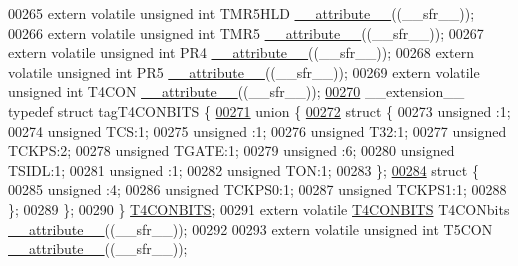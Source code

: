 \begin{DoxyCode}
00265 \textcolor{keyword}{extern} \textcolor{keyword}{volatile} \textcolor{keywordtype}{unsigned} \textcolor{keywordtype}{int}  TMR5HLD \hyperlink{a00009_a493c46f03454991ccc5aa7a6e1dfb2a7}{\_\_attribute\_\_}((\_\_sfr\_\_));
00266 \textcolor{keyword}{extern} \textcolor{keyword}{volatile} \textcolor{keywordtype}{unsigned} \textcolor{keywordtype}{int}  TMR5 \hyperlink{a00009_a493c46f03454991ccc5aa7a6e1dfb2a7}{\_\_attribute\_\_}((\_\_sfr\_\_));
00267 \textcolor{keyword}{extern} \textcolor{keyword}{volatile} \textcolor{keywordtype}{unsigned} \textcolor{keywordtype}{int}  PR4 \hyperlink{a00009_a493c46f03454991ccc5aa7a6e1dfb2a7}{\_\_attribute\_\_}((\_\_sfr\_\_));
00268 \textcolor{keyword}{extern} \textcolor{keyword}{volatile} \textcolor{keywordtype}{unsigned} \textcolor{keywordtype}{int}  PR5 \hyperlink{a00009_a493c46f03454991ccc5aa7a6e1dfb2a7}{\_\_attribute\_\_}((\_\_sfr\_\_));
00269 \textcolor{keyword}{extern} \textcolor{keyword}{volatile} \textcolor{keywordtype}{unsigned} \textcolor{keywordtype}{int}  T4CON \hyperlink{a00009_a493c46f03454991ccc5aa7a6e1dfb2a7}{\_\_attribute\_\_}((\_\_sfr\_\_));
\hypertarget{a00009_source_l00270}{}\hyperlink{a00008}{00270} \_\_extension\_\_ \textcolor{keyword}{typedef} \textcolor{keyword}{struct }tagT4CONBITS \{
\hypertarget{a00009_source_l00271}{}\hyperlink{a00009}{00271}   \textcolor{keyword}{union }\{
\hypertarget{a00009_source_l00272}{}\hyperlink{a00009}{00272}     \textcolor{keyword}{struct }\{
00273       \textcolor{keywordtype}{unsigned} :1;
00274       \textcolor{keywordtype}{unsigned} TCS:1;
00275       \textcolor{keywordtype}{unsigned} :1;
00276       \textcolor{keywordtype}{unsigned} T32:1;
00277       \textcolor{keywordtype}{unsigned} TCKPS:2;
00278       \textcolor{keywordtype}{unsigned} TGATE:1;
00279       \textcolor{keywordtype}{unsigned} :6;
00280       \textcolor{keywordtype}{unsigned} TSIDL:1;
00281       \textcolor{keywordtype}{unsigned} :1;
00282       \textcolor{keywordtype}{unsigned} TON:1;
00283     \};
\hypertarget{a00009_source_l00284}{}\hyperlink{a00009}{00284}     \textcolor{keyword}{struct }\{
00285       \textcolor{keywordtype}{unsigned} :4;
00286       \textcolor{keywordtype}{unsigned} TCKPS0:1;
00287       \textcolor{keywordtype}{unsigned} TCKPS1:1;
00288     \};
00289   \};
00290 \} \hyperlink{a00008_da/db8/a00797}{T4CONBITS};
00291 \textcolor{keyword}{extern} \textcolor{keyword}{volatile} \hyperlink{a00008_da/db8/a00797}{T4CONBITS} T4CONbits \hyperlink{a00009_a493c46f03454991ccc5aa7a6e1dfb2a7}{\_\_attribute\_\_}((\_\_sfr\_\_));
00292 
00293 \textcolor{keyword}{extern} \textcolor{keyword}{volatile} \textcolor{keywordtype}{unsigned} \textcolor{keywordtype}{int}  T5CON \hyperlink{a00009_a493c46f03454991ccc5aa7a6e1dfb2a7}{\_\_attribute\_\_}((\_\_sfr\_\_));

\end{DoxyCode}
